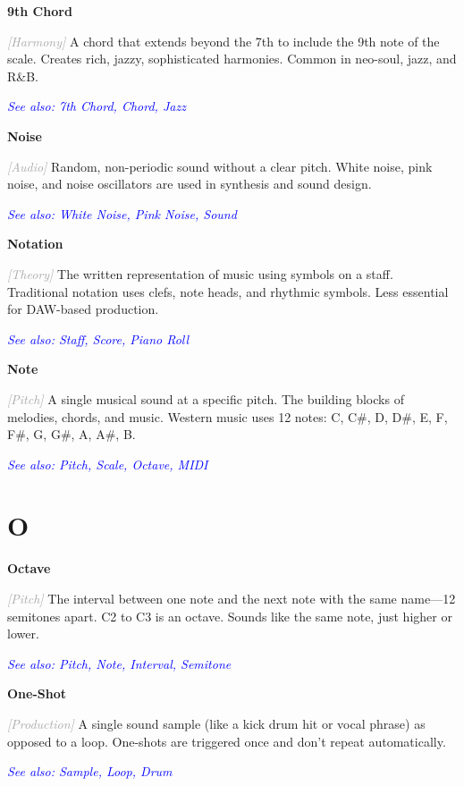 \documentclass[11pt,letterpaper]{article}
\newcommand{\term}[1]{\textbf{\large\color{purple}#1}}
\newcommand{\category}[1]{\textcolor{darkgray}{\textit{\small [#1]}}}
\newcommand{\seealso}[1]{\textcolor{blue}{\textit{See also: #1}}}
\newenvironment{termdef}[1]
  {\noindent\term{#1}\par\nopagebreak}
  {\par\vspace{0.3em}}
\begin{document}
\begin{termdef}{9th Chord}
\category{Harmony}
A chord that extends beyond the 7th to include the 9th note of the scale. Creates rich, jazzy, sophisticated harmonies. Common in neo-soul, jazz, and R\&B.

\seealso{7th Chord, Chord, Jazz}
\end{termdef}

\begin{termdef}{Noise}
\category{Audio}
Random, non-periodic sound without a clear pitch. White noise, pink noise, and noise oscillators are used in synthesis and sound design.

\seealso{White Noise, Pink Noise, Sound}
\end{termdef}

\begin{termdef}{Notation}
\category{Theory}
The written representation of music using symbols on a staff. Traditional notation uses clefs, note heads, and rhythmic symbols. Less essential for DAW-based production.

\seealso{Staff, Score, Piano Roll}
\end{termdef}

\begin{termdef}{Note}
\category{Pitch}
A single musical sound at a specific pitch. The building blocks of melodies, chords, and music. Western music uses 12 notes: C, C\#, D, D\#, E, F, F\#, G, G\#, A, A\#, B.

\seealso{Pitch, Scale, Octave, MIDI}
\end{termdef}

\newpage

\section*{O}

\begin{termdef}{Octave}
\category{Pitch}
The interval between one note and the next note with the same name—12 semitones apart. C2 to C3 is an octave. Sounds like the same note, just higher or lower.

\seealso{Pitch, Note, Interval, Semitone}
\end{termdef}

\begin{termdef}{One-Shot}
\category{Production}
A single sound sample (like a kick drum hit or vocal phrase) as opposed to a loop. One-shots are triggered once and don't repeat automatically.

\seealso{Sample, Loop, Drum}
\end{termdef}
\end{document}
